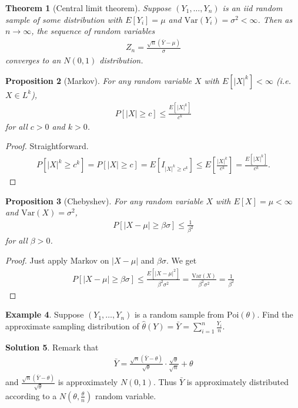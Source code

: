 \documentclass[11pt]{amsart}
\newtheorem{theorem}{Theorem}[section]
\newtheorem{proposition}[theorem]{Proposition}
\theoremstyle{definition}
\newtheorem{example}[theorem]{Example}
\newtheorem{solution}[theorem]{Solution}
\numberwithin{equation}{section}
\begin{document}
\begin{theorem}[Central limit theorem]
    Suppose $(Y_1,\ldots,Y_n)$ is an iid random sample of some distribution with $E[Y_i]=\mu$ and $\mathrm{Var}(Y_i)=\sigma^2<\infty$. Then as $n\to\infty$, the sequence of random variables
    \begin{align*}
        Z_n=\frac{\sqrt{n}(\bar Y-\mu)}{\sigma}
    \end{align*}
    converges to an $N(0,1)$ distribution.
\end{theorem}
\begin{proposition}[Markov]
    For any random variable $X$ with $E[|X|^k]<\infty$ (i.e. $X\in L^k$),
    \begin{align*}
        P[|X|\ge c]\le\frac{E[|X|^k]}{c^k}
    \end{align*}
    for all $c>0$ and $k>0$.
\end{proposition}
\begin{proof}
    Straightforward. 
    \begin{align*}
        P[|X|^k\ge c^k]=P[|X|\ge c]=E[I_{|X|^k\ge c^k}]\le E[\frac{|X|^k}{c^k}]=\frac{E[|X|^k]}{c^k}.
    \end{align*}
\end{proof}
\begin{proposition}[Chebyshev]
    For any random variable $X$ with $E[X]=\mu<\infty$ and $\mathrm{Var}(X)=\sigma^2$,
    \begin{align*}
        P[|X-\mu|\ge\beta\sigma]\le\frac{1}{\beta^2}
    \end{align*}
    for all $\beta>0$.
\end{proposition}
\begin{proof}
    Just apply Markov on $|X-\mu|$ and $\beta\sigma$. We get
    \begin{align*}
        P[|X-\mu|\ge\beta\sigma]\le\frac{E[|X-\mu|^2]}{\beta^2\sigma^2}=\frac{\mathrm{Var}(X)}{\beta^2\sigma^2}=\frac{1}{\beta^2}
    \end{align*}
\end{proof}
\begin{example}
    Suppose $(Y_1,\ldots,Y_n)$ is a random sample from $\mathrm{Poi}(\theta)$. Find the approximate sampling distribution of $\hat\theta(Y)=\bar Y=\sum_{i=1}^n\frac{Y_i}{n}$.
\end{example}
\addtocounter{theorem}{-1}
\begin{solution}
    Remark that 
    \begin{align*}
        \bar Y=\frac{\sqrt n(\bar Y-\theta)}{\sqrt{\theta}}\cdot\frac{\sqrt\theta}{\sqrt n}+\theta
    \end{align*}
    and $\frac{\sqrt n(\bar Y-\theta)}{\sqrt{\theta}}$ is approximately $N(0,1)$. Thus $\bar Y$ is approximately distributed according to a $N(\theta,\frac{\theta}{n})$ random variable.
\end{solution}
\end{document}
